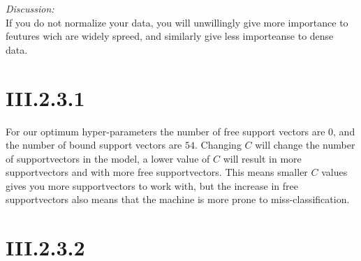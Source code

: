 \noindent \textit{Discussion:}\\
If you do not normalize your data, you will unwillingly give more importance to
feutures wich are widely spreed, and similarly give less importeanse to dense
data.

\section*{III.2.3.1}
For our optimum hyper-parameters the number of free support vectors are $0$, and
the number of bound support vectors are $54$. Changing $C$ will change the
number of supportvectors in the model, a lower value of $C$ will result in more
supportvectors and with more free supportvectors. This means smaller $C$ values
gives you more supportvectors to work with, but the increase in free
supportvectors also means that the machine is more prone to miss-classification.

\section*{III.2.3.2}
